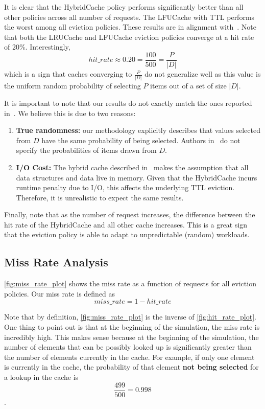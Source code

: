 It is clear that the HybridCache policy performs significantly
better than all other policies across all number of requests.
The LFUCache with TTL performs the worst
among all eviction policies. These results
are in alignment with~\cite{shah2023ImprovedCacheEviction}.
Note that both the LRUCache and LFUCache eviction
policies converge at a hit rate of 20\%.
Interestingly, \[hit\_rate \approx 0.20 = \frac{100}{500} = \frac{P}{|D|}\]
which is a sign that caches converging
to $\frac{P}{|D|}$ do not generalize well as this value
is the uniform random probability of selecting $P$ items
out of a set of size $|D|$.

It is important to note that our results do not
exactly match
the ones reported in~\cite{shah2023ImprovedCacheEviction}.
We believe this is due to two reasons:

\begin{enumerate}
    \item \textbf{True randomness:} our methodology explicitly
    describes that values selected from $D$ have the same
    probability of being selected. Authors in~\cite{shah2023ImprovedCacheEviction}
    do not specify the probabilities of items drawn from $D$.
    \item \textbf{I/O Cost:} The hybrid cache
    described in~\cite{shah2023ImprovedCacheEviction}
    makes the assumption that all data structures
    and data live in memory. Given that the HybridCache
    incurs runtime penalty due to I/O, this affects
    the underlying TTL eviction. Therefore,
    it is unrealistic to expect the same results.
\end{enumerate}

Finally, note that as the number of request increases, the
difference between the hit rate of the HybridCache
and all other cache increases. This is a great sign
that the eviction policy is able to adapt to unpredictable
(random)
workloads.

\subsection{Miss Rate Analysis}

\autoref{fig:miss_rate_plot} shows the miss rate as a function
of requests for all eviction policies.
Our miss rate is defined as
\[miss\_rate = 1 - hit\_rate\]

Note that by definition, \autoref{fig:miss_rate_plot}
is the inverse of \autoref{fig:hit_rate_plot}. 
One thing to point out is that at the beginning
of the simulation, the miss rate is incredibly high.
This makes sense because at the beginning of the simulation,
the number of elements that can be possibly looked up
is significantly greater than the number of elements
currently in the cache. For example, if only
one element is currently in the cache,
the probability of that element \textbf{not being selected}
for a lookup in the cache is \[\frac{499}{500} = 0.998\].

